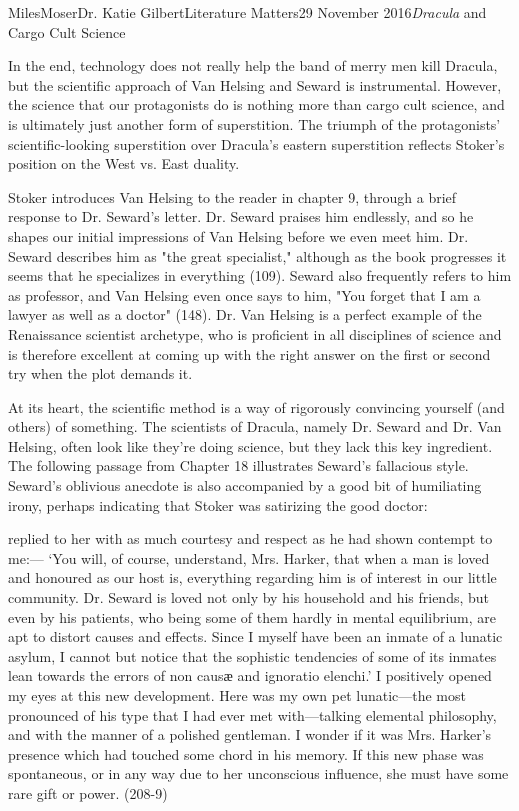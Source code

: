 \documentclass[12pt,letterpaper]{article}
\renewenvironment{quote}
  {\list{}{\rightmargin=0.5in \leftmargin=0.5in}%
   \item\relax}
  {\endlist}
\begin{document}
\begin{mla}{Miles}{Moser}{Dr. Katie Gilbert}{Literature Matters}{29 November 2016}{\textit{Dracula} and Cargo Cult Science}

In the end, technology does not really help the band of merry men kill Dracula, but the scientific approach of Van Helsing and Seward is instrumental. However, the science that our protagonists do is nothing more than cargo cult science, and is ultimately just another form of superstition. The triumph of the protagonists’ scientific-looking superstition over Dracula’s eastern superstition reflects Stoker’s position on the West vs. East duality.

Stoker introduces Van Helsing to the reader in chapter 9, through a brief response to Dr. Seward's letter. Dr. Seward praises him endlessly, and so he shapes our initial impressions of Van Helsing before we even meet him. Dr. Seward describes him as "the great specialist," although as the book progresses it seems that he specializes in everything (109). Seward also frequently refers to him as professor, and Van Helsing even once says to him, "You forget that I am a lawyer as well as a doctor" (148). Dr. Van Helsing is a perfect example of the Renaissance scientist archetype, who is proficient in all disciplines of science and is therefore excellent at coming up with the right answer on the first or second try when the plot demands it.

At its heart, the scientific method is a way of rigorously convincing yourself (and others) of something. The scientists of Dracula, namely Dr. Seward and Dr. Van Helsing, often look like they’re doing science, but they lack this key ingredient. The following passage from Chapter 18 illustrates Seward’s fallacious style. Seward’s oblivious anecdote is also accompanied by a good bit of humiliating irony, perhaps indicating that Stoker was satirizing the good doctor:

\begin{quote}
[Renfield] replied to her with as much courtesy and respect as he had shown contempt to me:—
‘You will, of course, understand, Mrs. Harker, that when a man is loved and honoured as our host is, everything regarding him is of interest in our little community. Dr. Seward is loved not only by his household and his friends, but even by his patients, who being some of them hardly in mental equilibrium, are apt to distort causes and effects. Since I myself have been an inmate of a lunatic asylum, I cannot but notice that the sophistic tendencies of some of its inmates lean towards the errors of non causӕ and ignoratio elenchi.’ I positively opened my eyes at this new development. Here was my own pet lunatic—the most pronounced of his type that I had ever met with—talking elemental philosophy, and with the manner of a polished gentleman. I wonder if it was Mrs. Harker’s presence which had touched some chord in his memory. If this new phase was spontaneous, or in any way due to her unconscious influence, she must have some rare gift or power. (208-9)
\end{quote}


\end{mla}
\end{document}
